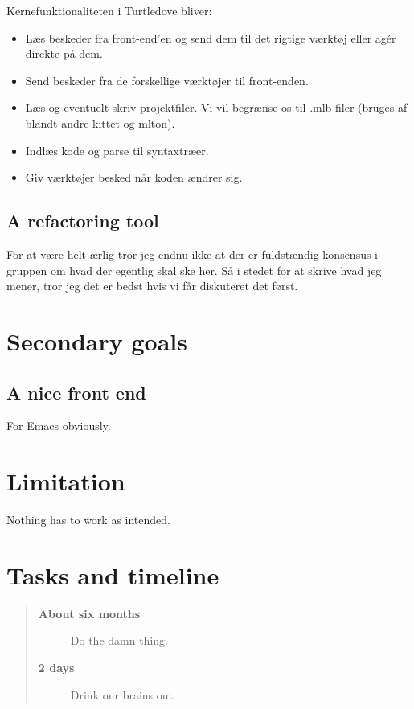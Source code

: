 \documentclass[a4paper,11pt,fleqn]{article}
\begin{document}
Kernefunktionaliteten i Turtledove bliver:
\begin{itemize}
\item Læs beskeder fra front-end'en og send dem til det rigtige værktøj eller agér direkte på dem.
\item Send beskeder fra de forskellige værktøjer til front-enden.
\item Læs og eventuelt skriv projektfiler. Vi vil begrænse os til .mlb-filer (bruges af blandt andre
      kittet og mlton).
\item Indlæs kode og parse til syntaxtræer.
\item Giv værktøjer besked når koden ændrer sig.
\end{itemize}

\subsection{A refactoring tool}\label{primary_goals:a_refactoring_tool}
For at være helt ærlig tror jeg endnu ikke at der er fuldstændig konsensus i gruppen om hvad der
egentlig skal ske her. Så i stedet for at skrive hvad jeg mener, tror jeg det er bedst hvis vi får
diskuteret det først.

\section{Secondary goals}

\subsection{A nice front end}
For Emacs obviously.

\section{Limitation}
Nothing has to work as intended.

\section{Tasks and timeline}
\begin{quote}
\begin{description}
\item[\bf About six months] Do the damn thing.
\item[\bf 2 days] Drink our brains out.
\end{description}
\end{quote}
\end{document}
